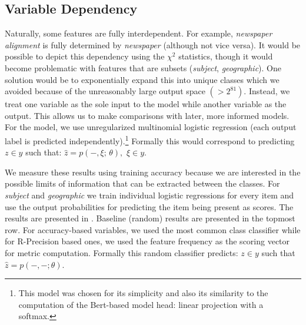 \subsection{Variable Dependency} \label{subsec:feature_dependency}

Naturally, some features are fully interdependent.
For example, \emph{newspaper alignment} is fully determined by \emph{newspaper} (although not vice versa).
It would be possible to depict this dependency using the $\chi^2$ statistics, though it would become problematic with features that are subsets (\emph{subject}, \emph{geographic}).
One solution would be to exponentially expand this into unique classes which we avoided because of the unreasonably large output space $({>}2^{81})$.
Instead, we treat one variable as the sole input to the model while another variable as the output.
This allows us to make comparisons with later, more informed models.
For the model, we use unregularized multinomial logistic regression (each output label is predicted independently).\footnote{
This model was chosen for its simplicity and also its similarity to the computation of the Bert-based model head: linear projection with a softmax.
}
Formally this would correspond to predicting $z\in y$ such that:
$\hat{z} = p(-,\xi;\, \theta),\,\, \xi \in y$.

We measure these results using training accuracy because we are interested in the possible limits of information that can be extracted between the classes.
For \emph{subject} and \emph{geographic} we train individual logistic regressions for every item and use the output probabilities for predicting the item being present as scores.
The results are presented in .
Baseline (random) results are presented in the topmost row.
For accuracy-based variables, we used the most common class classifier while for R-Precision based ones, we used the feature frequency as the scoring vector for metric computation.
Formally this random classifier predicts: $z\in y$ such that $\hat{z} = p(-,-;\theta)$.

